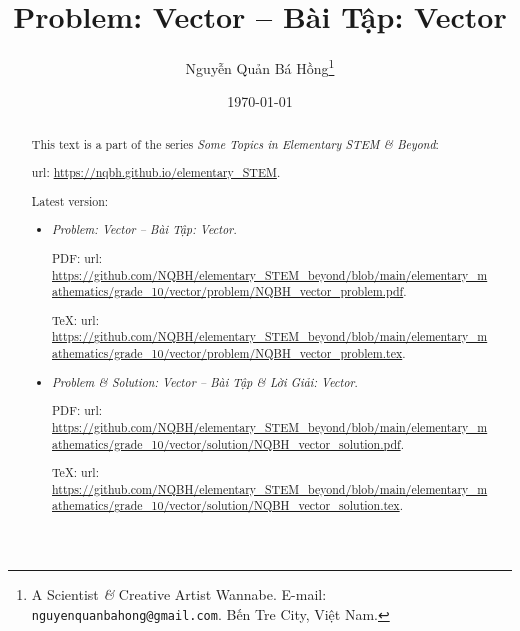 \documentclass{article}
\title{Problem: Vector -- Bài Tập: Vector}
\author{Nguyễn Quản Bá Hồng\footnote{A Scientist {\it\&} Creative Artist Wannabe. E-mail: {\tt nguyenquanbahong@gmail.com}. Bến Tre City, Việt Nam.}}
\date{\today}
\begin{document}
\maketitle
\begin{abstract}
	This text is a part of the series {\it Some Topics in Elementary STEM \& Beyond}:
	
	{\sc url}: \url{https://nqbh.github.io/elementary_STEM}.
	
	Latest version:
	\begin{itemize}
		\item {\it Problem: Vector -- Bài Tập: Vector}.
		
		PDF: {\sc url}: \url{https://github.com/NQBH/elementary_STEM_beyond/blob/main/elementary_mathematics/grade_10/vector/problem/NQBH_vector_problem.pdf}.
		
		\TeX: {\sc url}: \url{https://github.com/NQBH/elementary_STEM_beyond/blob/main/elementary_mathematics/grade_10/vector/problem/NQBH_vector_problem.tex}.
		\item {\it Problem \& Solution: Vector -- Bài Tập \& Lời Giải: Vector}.
		
		PDF: {\sc url}: \url{https://github.com/NQBH/elementary_STEM_beyond/blob/main/elementary_mathematics/grade_10/vector/solution/NQBH_vector_solution.pdf}.
		
		\TeX: {\sc url}: \url{https://github.com/NQBH/elementary_STEM_beyond/blob/main/elementary_mathematics/grade_10/vector/solution/NQBH_vector_solution.tex}.
	\end{itemize}
\end{abstract}
\tableofcontents

\end{document}
